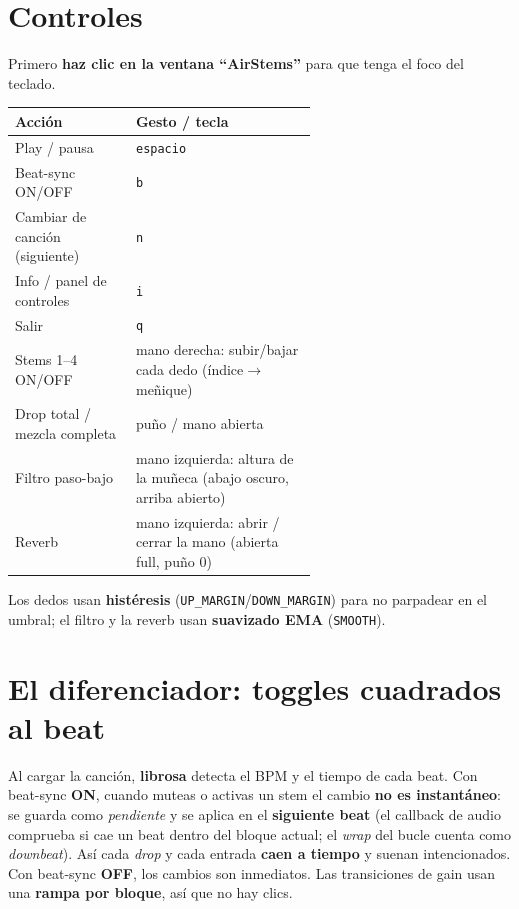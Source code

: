 \documentclass[11pt]{article}
\newcommand{\code}[1]{\texttt{#1}}
\begin{document}
\section{Controles}

Primero \textbf{haz clic en la ventana ``AirStems''} para que tenga el foco del teclado.

\begin{center}
\begin{tabular}{@{}l p{0.60\linewidth}@{}}
\toprule
\textbf{Acción} & \textbf{Gesto / tecla} \\
\midrule
Play / pausa & \code{espacio} \\
Beat-sync ON/OFF & \code{b} \\
Cambiar de canción (siguiente) & \code{n} \\
Info / panel de controles & \code{i} \\
Salir & \code{q} \\
Stems 1--4 ON/OFF & mano derecha: subir/bajar cada dedo (índice$\to$meñique) \\
Drop total / mezcla completa & puño / mano abierta \\
Filtro paso-bajo & mano izquierda: altura de la muñeca (abajo oscuro, arriba abierto) \\
Reverb & mano izquierda: abrir / cerrar la mano (abierta full, puño 0) \\
\bottomrule
\end{tabular}
\end{center}

Los dedos usan \textbf{histéresis} (\code{UP\_MARGIN}/\code{DOWN\_MARGIN}) para no parpadear en el
umbral; el filtro y la reverb usan \textbf{suavizado EMA} (\code{SMOOTH}).

\section{El diferenciador: toggles cuadrados al beat}

Al cargar la canción, \textbf{librosa} detecta el BPM y el tiempo de cada beat. Con beat-sync
\textbf{ON}, cuando muteas o activas un stem el cambio \textbf{no es instantáneo}: se guarda como
\emph{pendiente} y se aplica en el \textbf{siguiente beat} (el callback de audio comprueba si cae un
beat dentro del bloque actual; el \emph{wrap} del bucle cuenta como \emph{downbeat}). Así cada
\emph{drop} y cada entrada \textbf{caen a tiempo} y suenan intencionados. Con beat-sync
\textbf{OFF}, los cambios son inmediatos. Las transiciones de gain usan una \textbf{rampa por
bloque}, así que no hay clics.
\end{document}
